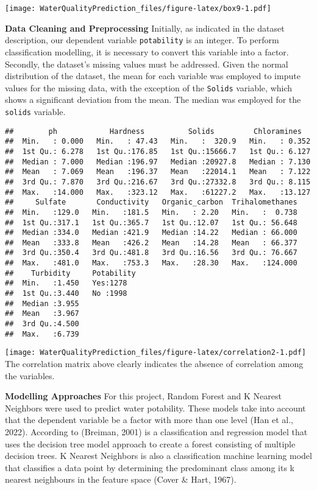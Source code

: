 \documentclass[
]{article}
\begin{document}
\texttt{[image: WaterQualityPrediction\_files/figure-latex/box9-1.pdf]}

\textbf{Data Cleaning and Preprocessing} Initially, as indicated in the
dataset description, our dependent variable \texttt{potability} is an
integer. To perform classification modelling, it is necessary to convert
this variable into a factor. Secondly, the dataset's missing values must
be addressed. Given the normal distribution of the dataset, the mean for
each variable was employed to impute values for the missing data, with
the exception of the \texttt{Solids} variable, which shows a significant
deviation from the mean. The median was employed for the \texttt{solids}
variable.

\begin{verbatim}
##        ph            Hardness          Solids         Chloramines    
##  Min.   : 0.000   Min.   : 47.43   Min.   :  320.9   Min.   : 0.352  
##  1st Qu.: 6.278   1st Qu.:176.85   1st Qu.:15666.7   1st Qu.: 6.127  
##  Median : 7.000   Median :196.97   Median :20927.8   Median : 7.130  
##  Mean   : 7.069   Mean   :196.37   Mean   :22014.1   Mean   : 7.122  
##  3rd Qu.: 7.870   3rd Qu.:216.67   3rd Qu.:27332.8   3rd Qu.: 8.115  
##  Max.   :14.000   Max.   :323.12   Max.   :61227.2   Max.   :13.127  
##     Sulfate       Conductivity   Organic_carbon  Trihalomethanes  
##  Min.   :129.0   Min.   :181.5   Min.   : 2.20   Min.   :  0.738  
##  1st Qu.:317.1   1st Qu.:365.7   1st Qu.:12.07   1st Qu.: 56.648  
##  Median :334.0   Median :421.9   Median :14.22   Median : 66.000  
##  Mean   :333.8   Mean   :426.2   Mean   :14.28   Mean   : 66.377  
##  3rd Qu.:350.4   3rd Qu.:481.8   3rd Qu.:16.56   3rd Qu.: 76.667  
##  Max.   :481.0   Max.   :753.3   Max.   :28.30   Max.   :124.000  
##    Turbidity     Potability
##  Min.   :1.450   Yes:1278  
##  1st Qu.:3.440   No :1998  
##  Median :3.955             
##  Mean   :3.967             
##  3rd Qu.:4.500             
##  Max.   :6.739
\end{verbatim}

\texttt{[image: WaterQualityPrediction\_files/figure-latex/correlation2-1.pdf]}
The correlation matrix above clearly indicates the absence of
correlation among the variables.

\textbf{Modelling Approaches} For this project, Random Forest and K
Nearest Neighbors were used to predict water potability. These models
take into account that the dependent variable be a factor with more than
one level (Han et al., 2022). According to (Breiman, 2001) is a
classification and regression model that uses the decision tree model
approach to create a forest consisting of multiple decision trees. K
Nearest Neighbors is also a classification machine learning model that
classifies a data point by determining the predominant class among its k
nearest neighbours in the feature space (Cover \& Hart, 1967).
\end{document}
